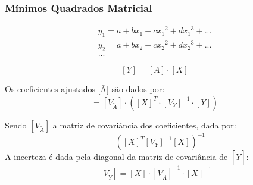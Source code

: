 \begin{frame}
  \frametitle{Mínimos Quadrados Matricial} 
\begin{equation*}
  \label{eq:polinomio}
  \begin{split}
    y_1 = a + b x_1 + c{x_1}^2 + d{x_1}^3 + ...\\
    y_2 = a + b x_2 + c{x_2}^2 + d{x_2}^3 + ... \\
    ...
  \end{split}
\end{equation*}

\begin{equation*}
  \label{eq:polinomioMatriz}
  [Y] = [A] \cdot [X]
\end{equation*}

Os coeficientes ajustados [Ã] são dados por:
\begin{equation*}
  [\tilde{A}] = [V_{\tilde{A}}] \cdot ([X]^T \cdot {[V_Y]}^{-1} \cdot [Y])
\end{equation*}

Sendo $[V_{\tilde{A}}]$ a matriz de covariância dos coeficientes, dada por:
\begin{equation*}
  [V_{\tilde{A}}] = ([X]^T [V_Y]^{-1} [X])^{-1}
\end{equation*}
A incerteza é dada pela diagonal da matriz de covariância de $[\tilde{Y}]$:
\begin{equation*}
\label{eq:matrizcovarianciaY}
[V_{\tilde{Y}}] = [X] \cdot [V_{\tilde{A}}]^{-1} \cdot [X]^{-1}
\end{equation*}
\end{frame}

